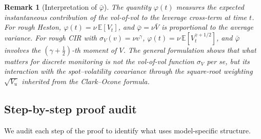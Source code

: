 \documentclass[12pt]{article}
\newtheorem{remark}{Remark}
\theoremstyle{definition}
\newcommand{\E}{\mathbb{E}}
\begin{document}
\begin{remark}[Interpretation of $\bar\varphi$]
The quantity $\varphi(t)$ measures the expected instantaneous
contribution of the vol-of-vol to the leverage cross-term at time $t$.
For rough Heston, $\varphi(t) = \nu\,\E[V_t]$, and
$\bar\varphi = \nu\bar V$ is proportional to the average variance.
For rough CIR with $\sigma_V(v) = \nu v^\gamma$,
$\varphi(t) = \nu\,\E[V_t^{\gamma+1/2}]$, and
$\bar\varphi$ involves the $(\gamma+\tfrac12)$-th moment of $V$.
The general formulation shows that what matters for discrete monitoring
is not the vol-of-vol function $\sigma_V$ \emph{per se}, but its
interaction with the spot--volatility covariance through the
square-root weighting $\sqrt{V_u}$ inherited from the Clark--Ocone
formula.
\end{remark}

\subsection{Step-by-step proof audit}

We audit each step of the proof to identify what uses model-specific
structure.
\end{document}
